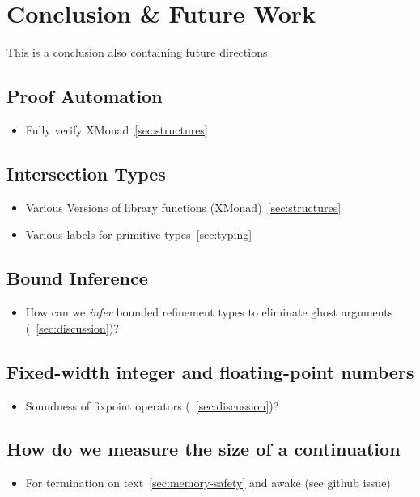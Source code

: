 \chapter{Conclusion \& Future Work}\label{chapter:conclusion}
This is a conclusion also containing future directions.

\section{Proof Automation}\label{future:proofautomation}
\begin{itemize}
\item Fully verify XMonad~\ref{sec:structures}
\end{itemize}

\section{Intersection Types}\label{future:intersection}
\begin{itemize}
\item Various Versions of library functions (XMonad)~\ref{sec:structures}
\item Various labels for primitive types~\ref{sec:typing}
\end{itemize}

\section{Bound Inference}\label{future:ghost}
\begin{itemize}
\item How can we \textit{infer} bounded refinement types
to eliminate ghost arguments (~\ref{sec:discussion})?
\end{itemize}

\section{{Fixed-width integer and floating-point numbers}}\label{future:fp}
\begin{itemize}
\item Soundness of fixpoint operators (~\ref{sec:discussion})?
\end{itemize}


\section{How do we measure the size of a continuation}\label{future:continuations}
\begin{itemize}
\item For termination on text~\ref{sec:memory-safety} and awake (see github issue)
\end{itemize}


